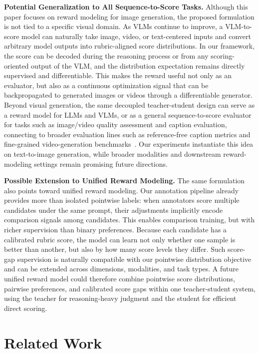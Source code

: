 \documentclass{llmxive}
\begin{document}
\textbf{Potential Generalization to All Sequence-to-Score Tasks.}
Although this paper focuses on reward modeling for image generation, the proposed formulation is not tied to a specific visual domain. As VLMs continue to improve, a VLM-to-score model can naturally take image, video, or text-centered inputs and convert arbitrary model outputs into rubric-aligned score distributions. In our framework, the score can be decoded during the reasoning process or from any scoring-oriented output of the VLM, and the distribution expectation remains directly supervised and differentiable. This makes the reward useful not only as an evaluator, but also as a continuous optimization signal that can be backpropagated to generated images or videos through a differentiable generator. Beyond visual generation, the same decoupled teacher-student design can serve as a reward model for LLMs and VLMs, or as a general sequence-to-score evaluator for tasks such as image/video quality assessment and caption evaluation, connecting to broader evaluation lines such as reference-free caption metrics and fine-grained video-generation benchmarks~\cite{hessel2021clipscore,huang2024vbench}. Our experiments instantiate this idea on text-to-image generation, while broader modalities and downstream reward-modeling settings remain promising future directions.

\textbf{Possible Extension to Unified Reward Modeling.}
The same formulation also points toward unified reward modeling. Our annotation pipeline already provides more than isolated pointwise labels: when annotators score multiple candidates under the same prompt, their adjustments implicitly encode comparison signals among candidates. This enables comparison training, but with richer supervision than binary preferences. Because each candidate has a calibrated rubric score, the model can learn not only whether one sample is better than another, but also by how many score levels they differ. Such score-gap supervision is naturally compatible with our pointwise distribution objective and can be extended across dimensions, modalities, and task types. A future unified reward model could therefore combine pointwise score distributions, pairwise preferences, and calibrated score gaps within one teacher-student system, using the teacher for reasoning-heavy judgment and the student for efficient direct scoring.

\section{Related Work}
\end{document}
